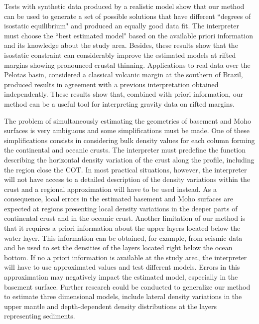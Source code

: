 \documentclass[manuscript,revised]{geophysics}
\begin{document}
Tests with synthetic data produced by a realistic model show that our method can 
be used to generate a set of possible solutions that have different ``degrees of isostatic 
equilibrium" and produced an equally good data fit. 
The interpreter must choose the ``best estimated model" based on the 
available priori information and its knowledge about the study area.
Besides, these results show that the isostatic constraint can considerably improve 
the estimated models at rifted margins showing pronounced crustal thinning. 
Applications to real data over the Pelotas basin, considered a classical volcanic
margin at the southern of Brazil, produced results in agreement with a previous 
interpretation obtained independently.
These results show that, combined with priori information, our method can be a 
useful tool for interpreting gravity data on rifted margins.

The problem of simultaneously estimating the geometries of basement and Moho surfaces
is very ambiguous and some simplifications must be made. 
One of these simplifications consists in considering bulk density 
values for each column forming the continental and oceanic crusts. 
The interpreter must predefine the function describing the horizontal density
variation of the crust along the profile, including the region close the COT.
In most practical situations, however, the interpreter will not have access to a detailed
description of the density variations within the crust and a regional approximation
will have to be used instead.
As a consequence, local errors in the estimated basement and Moho surfaces are expected 
at regions presenting local density variations in the deeper parts of continental crust 
and in the oceanic crust.
Another limitation of our method is that it requires a priori information about the
upper layers located below the water layer.
This information can be obtained, for example, from seismic data and be used to set
the densities of the layers located right below the ocean bottom.
If no a priori information is available at the study area, the interpreter will have to use
approximated values and test different models.
Errors in this approximation may negatively impact the estimated model, especially in 
the basement surface.
Further research could be conducted to generalize our method to estimate
three dimensional models, include lateral density variations in the upper mantle
and depth-dependent density distributions at the layers representing sediments.


\end{document}
